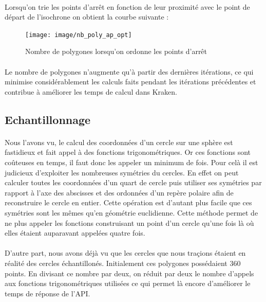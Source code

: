 \documentclass[a4paper]{report}
\begin{document}
\paragraph{} Lorsqu'on trie les points d'arrêt en fonction de leur proximité avec le point de départ de l'isochrone on obtient la courbe suivante :

\begin{figure}[H]
	\begin{center}
		\texttt{[image: image/nb\_poly\_ap\_opt]}
		\caption{Nombre de polygones lorsqu'on ordonne les points d'arrêt}
		\label{Nombre de polygones lorsqu'on ordonne les points d'arrêt}
	\end{center}
\end{figure}

\paragraph{} Le nombre de polygones n'augmente qu'à partir des dernières itérations, ce qui minimise considérablement les calculs faits pendant les itérations précédentes et contribue à améliorer les temps de calcul dans Kraken.

\subsection{Echantillonnage}

\paragraph{} Nous l'avons vu, le calcul des coordonnées d'un cercle sur une sphère est fastidieux et fait appel à des fonctions trigonométriques. Or ces fonctions sont coûteuses en temps, il faut donc les appeler un minimum de fois. Pour celà il est judicieux d'exploiter les nombreuses symétries du cercles. En effet on peut calculer toutes les coordonnées d'un quart de cercle puis utiliser ses symétries par rapport à l'axe des abscisses et des ordonnées d'un repère polaire afin de reconstruire le cercle en entier. Cette opération est d'autant plus facile que ces symétries sont les mêmes qu'en géométrie euclidienne. Cette méthode permet de ne plus appeler les fonctions construisant un point d'un cercle qu'une fois là où elles étaient auparavant appelées quatre fois.

\paragraph{} D'autre part, nous avons déjà vu que les cercles que nous traçions étaient en réalité des cercles échantillonés. Initialement ces polygones possédaient 360 points. En divisant ce nombre par deux, on réduit par deux le nombre d'appels aux fonctions trigonométriques utilisées ce qui permet là encore d'améliorer le temps de réponse de l'API.
\end{document}
